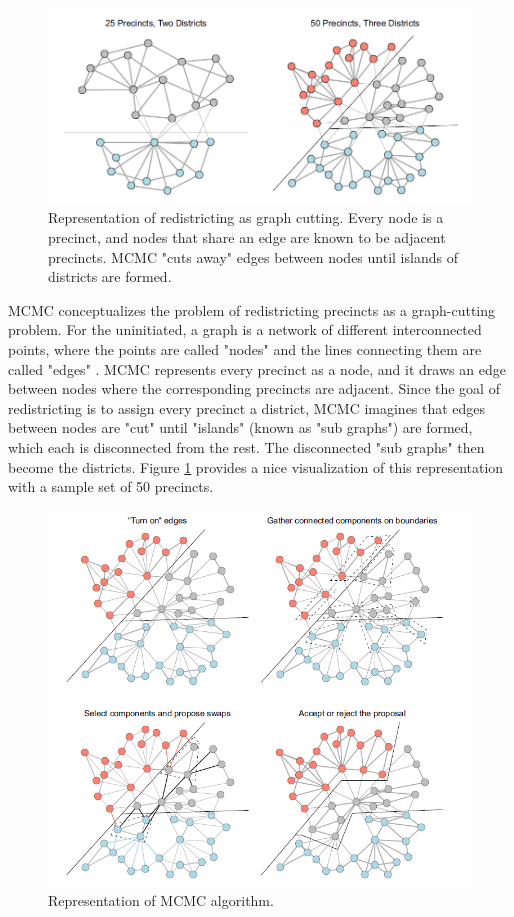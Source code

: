 \begin{figure}
    \includegraphics[width=\linewidth]{img/graphcut.png}
    \caption{Representation of redistricting as graph cutting. Every node is a precinct, and nodes that share an edge are known to be adjacent precincts. MCMC "cuts away" edges between nodes until islands of districts are formed. \parencite[3]{fifield2020}}
    \label{fig:graphcut}
\end{figure}

MCMC conceptualizes the problem of redistricting precincts as a graph-cutting problem. For the uninitiated, a graph is a network of different interconnected points, where the points are called "nodes" and the lines connecting them are called "edges" \parencite{fifield2020}. MCMC represents every precinct as a node, and it draws an edge between nodes where the corresponding precincts are adjacent. Since the goal of redistricting is to assign every precinct a district, MCMC imagines that edges between nodes are "cut" until "islands" (known as "sub graphs") are formed, which each is disconnected from the rest. The disconnected "sub graphs" then become the districts. Figure \ref{fig:graphcut} provides a nice visualization of this representation with a sample set of 50 precincts. \parencite{fifield2020}

\begin{figure}
    \includegraphics[width=\linewidth]{img/swaps.png}
    \caption{Representation of MCMC algorithm. \parencite[4]{fifield2020}}
    \label{fig:swaps}
\end{figure}

